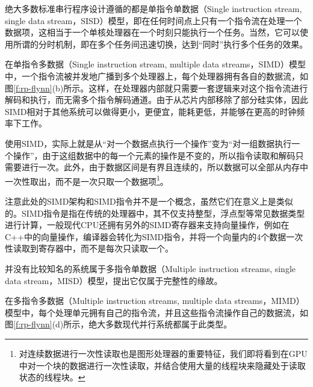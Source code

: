 绝大多数标准串行程序设计遵循的都是单指令单数据（Single instruction stream, single data stream，SISD）模型，即在任何时间点上只有一个指令流在处理一个数据项，这相当于一个单核处理器在一个时刻只能执行一个任务。当然，它可以使用所谓的分时机制，即在多个任务间迅速切换，达到“同时”执行多个任务的效果。

在单指令多数据（Single instruction stream, multiple data streams，SIMD）模型中，一个指令流被并发地广播到多个处理器上，每个处理器拥有各自的数据流，如图\ref{f:rp-flynn}(b)所示。这样，在处理器内部就只需要一套逻辑来对这个指令流进行解码和执行，而无需多个指令解码通道。由于从芯片内部移除了部分硅实体，因此SIMD相对于其他系统可以做得更小，更便宜，能耗更低，并能够在更高的时钟频率下工作。

使用SIMD，实际上就是从“对一个数据点执行一个操作”变为“对一组数据执行一个操作”，由于这组数据中的每一个元素的操作是不变的，所以指令读取和解码只需要进行一次。此外，由于数据区间是有界且连续的，所以数据可以全部从内存中一次性取出，而不是一次只取一个数据项\footnote{对连续数据进行一次性读取也是图形处理器的重要特征，我们即将看到在GPU中对一个块的数据进行一次性读取，并结合使用大量的线程块来隐藏处于读取状态的线程块。}。

\begin{shaded*}
	注意此处的SIMD架构和SIMD指令并不是一个概念，虽然它们在意义上是类似的。SIMD指令是指在传统的处理器中，其不仅支持整型，浮点型等常见数据类型进行计算，一般现代CPU还拥有另外的SIMD寄存器来支持向量操作，例如在C++中的向量操作，编译器会转化为SIMD指令，并将一个向量内的4个数据一次性读取到寄存器中，而不是每次只读取一个。
\end{shaded*}

并没有比较知名的系统属于多指令单数据（Multiple instruction streams, single data stream，MISD）模型，提出它仅属于完整性的缘故。

在多指令多数据（Multiple instruction streams, multiple data streams，MIMD）模型中，每个处理单元拥有自己的指令流，并且这些指令流操作自己的数据流，如图\ref{f:rp-flynn}(d)所示，绝大多数现代并行系统都属于此类型。





